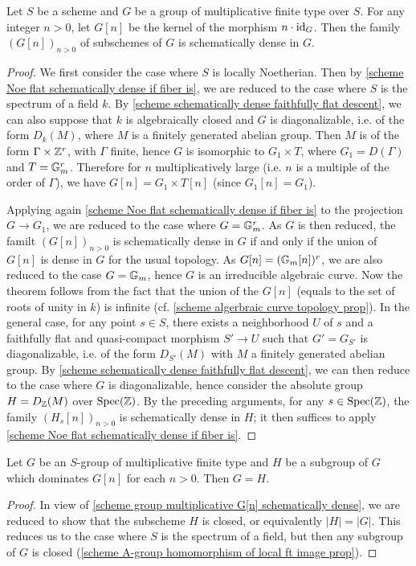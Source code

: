 \begin{theorem}\label{scheme group multiplicative G[n] schematically dense}
Let $S$ be a scheme and $G$ be a group of multiplicative finite type over $S$. For any integer $n>0$, let $G[n]$ be the kernel of the morphism $n\cdot\operatorname{id}_G$. Then the family $(G[n])_{n>0}$ of subschemes of $G$ is schematically dense in $G$.
\end{theorem}
\begin{proof}
We first consider the case where $S$ is locally Noetherian. Then by \cref{scheme Noe flat schematically dense if fiber is}, we are reduced to the case where $S$ is the spectrum of a field $k$. By \cref{scheme schematically dense faithfully flat descent}, we can also suppose that $k$ is algebraically closed and $G$ is diagonalizable, i.e. of the form $D_k(M)$, where $M$ is a finitely generated abelian group. Then $M$ is of the form $\Gamma\times\mathbb{Z}^r$, with $\Gamma$ finite, hence $G$ is isomorphic to $G_1\times T$, where $G_1=D(\Gamma)$ and $T=\mathbb{G}_m^r$. Therefore for $n$ multiplicatively large (i.e. $n$ is a multiple of the order of $\Gamma$), we have $G[n]=G_1\times T[n]$ (since $G_1[n]=G_1$).\par
Applying again \cref{scheme Noe flat schematically dense if fiber is} to the projection $G\to G_1$, we are reduced to the case where $G=\mathbb{G}_m^r$. As $G$ is then reduced, the familt $(G[n])_{n>0}$ is schematically dense in $G$ if and only if the union of $G[n]$ is dense in $G$ for the usual topology. As $G[n]=(\mathbb{G}_m[n])^r$, we are also reduced to the case $G=\mathbb{G}_m$, hence $G$ is an irreducible algebraic curve. Now the theorem follows from the fact that the union of the $G[n]$ (equals to the set of roots of unity in $k$) is infinite (cf. \cref{scheme algerbraic curve topology prop}).
In the general case, for any point $s\in S$, there exists a neighborhood $U$ of $s$ and a faithfully flat and quasi-compact morphism $S'\to U$ such that $G'=G_{S'}$ is diagonalizable, i.e. of the form $D_{S'}(M)$ with $M$ a finitely generated abelian group. By \cref{scheme schematically dense faithfully flat descent}, we can then reduce to the case where $G$ is diagonalizable, hence consider the absolute group $H=D_{\mathbb{Z}}(M)$ over $\mathrm{Spec}(\mathbb{Z})$. By the preceding arguments, for any $s\in\mathrm{Spec}(\mathbb{Z})$, the family $(H_s[n])_{n>0}$ is schematically dense in $H$; it then suffices to apply \cref{scheme Noe flat schematically dense if fiber is}.
\end{proof}

\begin{corollary}\label{scheme group multiplicative subgroup equal if dominates G[n]}
Let $G$ be an $S$-group of multiplicative finite type and $H$ be a subgroup of $G$ which dominates $G[n]$ for each $n>0$. Then $G=H$.
\end{corollary}
\begin{proof}
In view of \cref{scheme group multiplicative G[n] schematically dense}, we are reduced to show that the subscheme $H$ is closed, or equivalently $|H|=|G|$. This reduces us to the case where $S$ is the spectrum of a field, but then any subgroup of $G$ is closed (\cref{scheme A-group homomorphism of local ft image prop}).
\end{proof}

